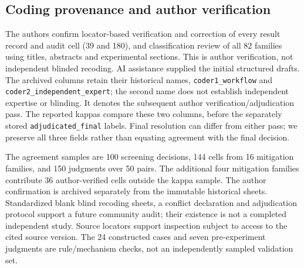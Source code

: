 \subsection{Coding provenance and author verification}
The authors confirm locator-based verification and correction of every result record and audit cell (39 and 180), and classification review of all 82 families using titles, abstracts and experimental sections. This is author verification, not independent blinded recoding. AI assistance supplied the initial structured drafts. The archived columns retain their historical names, \texttt{coder1\_workflow} and \texttt{coder2\_independent\_expert}; the second name does not establish independent expertise or blinding. It denotes the subsequent author verification/adjudication pass. The reported kappas compare these two columns, before the separately stored \texttt{adjudicated\_final} labels. Final resolution can differ from either pass; we preserve all three fields rather than equating agreement with the final decision.

The agreement samples are 100 screening decisions, 144 cells from 16 mitigation families, and 150 judgments over 50 pairs. The additional four mitigation families contribute 36 author-verified cells outside the kappa sample. The author confirmation is archived separately from the immutable historical sheets. Standardized blank blind recoding sheets, a conflict declaration and adjudication protocol support a future community audit; their existence is not a completed independent study. Source locators support inspection subject to access to the cited source version. The 24 constructed cases and seven pre-experiment judgments are rule/mechanism checks, not an independently sampled validation set.

